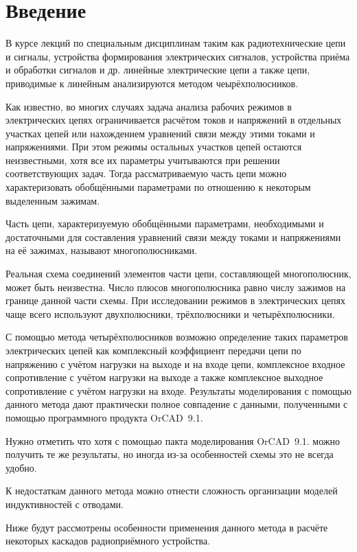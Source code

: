 \section*{Введение}

В  курсе  лекций  по  специальным  дисциплинам  таким  как радиотехнические цепи и сигналы, устройства формирования электрических сигналов,  устройства  приёма  и  обработки  сигналов  и  др.  линейные электрические  цепи а также цепи, приводимые к линейным анализируются методом чеырёхполюсников.  

Как известно, во многих случаях задача анализа рабочих режимов в электрических  цепях  ограничивается  расчётом  токов  и  напряжений  в отдельных участках цепей или нахождением уравнений связи между этими токами  и  напряжениями.  При  этом  режимы  остальных  участков  цепей остаются неизвестными,  хотя все их параметры учитываются при решении 
соответствующих  задач.  Тогда  рассматриваемую  часть  цепи  можно характеризовать  обобщёнными  параметрами  по  отношению  к  некоторым выделенным зажимам.  

Часть  цепи,  характеризуемую  обобщёнными  параметрами, необходимыми  и  достаточными  для  составления  уравнений  связи  между токами и напряжениями на её зажимах, называют многополюсниками. 

Реальная  схема  соединений  элементов  части  цепи,  составляющей многополюсник,  может  быть  неизвестна.  Число  плюсов  многополюсника равно  числу  зажимов  на  границе  данной  части  схемы.  При  исследовании режимов  в  электрических  цепях  чаще  всего  используют  двухполюсники, трёхполюсники и четырёхполюсники.  

С помощью метода четырёхполюсников возможно определение таких параметров  электрических  цепей  как  комплексный  коэффициент  передачи цепи по напряжению с учётом нагрузки на выходе и на входе цепи, комплексное  входное  сопротивление  с  учётом  нагрузки  на  выходе  а  также комплексное  выходное  сопротивление  с  учётом  нагрузки  на  входе. Результаты    моделирования  с  помощью  данного  метода  дают  практически полное  совпадение  с  данными,  полученными  с  помощью    программного продукта OrCAD~9.1. 

Нужно  отметить  что  хотя  с  помощью  пакта  моделирования  OrCAD~9.1. можно получить те же результаты,  но иногда из-за особенностей схемы это не всегда удобно. 

К недостаткам данного метода можно отнести сложность организации моделей индуктивностей с отводами. 

Ниже будут рассмотрены особенности применения данного метода в расчёте некоторых каскадов радиоприёмного устройства. 

